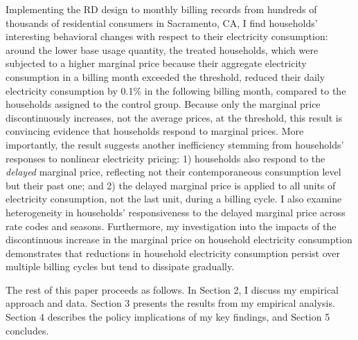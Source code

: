 Implementing the RD design to monthly billing records from hundreds of thousands of residential consumers in Sacramento, CA, I find households' interesting behavioral changes with respect to their electricity consumption: around the lower base usage quantity, the treated households, which were subjected to a higher marginal price because their aggregate electricity consumption in a billing month exceeded the threshold, reduced their daily electricity consumption by 0.1\% in the following billing month, compared to the households assigned to the control group. Because only the marginal price discontinuously increases, not the average prices, at the threshold, this result is convincing evidence that households respond to marginal prices. More importantly, the result suggests another inefficiency stemming from households' responses to nonlinear electricity pricing: 1) households also respond to the \textit{delayed} marginal price, reflecting not their contemporaneous consumption level but their past one; and 2) the delayed marginal price is applied to all units of electricity consumption, not the last unit, during a billing cycle. I also examine heterogeneity in households' responsiveness to the delayed marginal price across rate codes and seasons. Furthermore, my investigation into the impacts of the discontinuous increase in the marginal price on household electricity consumption demonstrates that reductions in household electricity consumption persist over multiple billing cycles but tend to dissipate gradually. 

The rest of this paper proceeds as follows. In Section 2, I discuss my empirical approach and data. Section 3 presents the results from my empirical analysis. Section 4 describes the policy implications of my key findings, and Section 5 concludes. 
